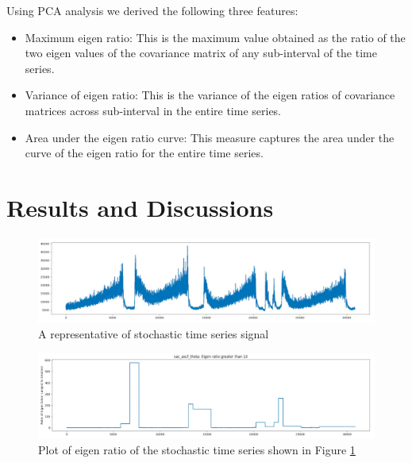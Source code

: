 \documentclass[10pt,conference]{IEEEtran}
\begin{document}
Using PCA analysis we derived the following three features:
\begin{itemize}
  \item Maximum eigen ratio: This is the maximum value obtained as the ratio of the two eigen values of the covariance matrix of any sub-interval of the time series.
  \item Variance of eigen ratio: This is the variance of the eigen ratios of covariance matrices across sub-interval in the entire time series.
  \item Area under the eigen ratio curve: This measure captures the area under the curve of the eigen ratio for the entire time series.
\end{itemize}

\section{Results and Discussions}

\begin{figure}[ht]
  \centering
  \includegraphics[width=\linewidth]{theta_ts.png}
  \caption{A representative of stochastic time series signal}
  \label{theta_ts}
\end{figure}
\begin{figure}[ht]
  \centering
  \includegraphics[width=\linewidth]{theta_ts_eig.png}
  \caption{Plot of eigen ratio of the  stochastic time series shown in Figure \ref{theta_ts}}
  \label{theta_eig}
\end{figure}
\end{document}
